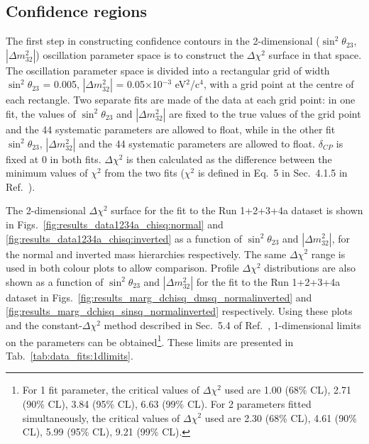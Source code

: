 \clearpage

\subsection {Confidence regions}
\label{sec:results_contours}

The first step in constructing confidence contours in the 2-dimensional ($\sin^{2}\theta_{23}$, $|\Delta m^{2}_{32}|$)
oscillation parameter space is to construct the $\Delta\chi^2$ surface in that space.
The oscillation parameter space is divided into a rectangular grid of width $\sin^{2}\theta_{23}$ = 0.005, $|\Delta m^{2}_{32}|$ = 
0.05$\times$10$^{-3}$ eV$^{2}$/c$^{4}$, with a grid point at the centre of each rectangle. Two separate fits are made of 
the data at each grid point: in one fit, the values of $\sin^{2}\theta_{23}$ and $|\Delta m^{2}_{32}|$ are fixed to the true 
values of the grid point and the 44 systematic parameters are allowed to float, while in the other fit $\sin^{2}\theta_{23}$, 
$|\Delta m^{2}_{32}|$ and the 44 systematic parameters are allowed to float. $\delta_{CP}$ is fixed at 0 in both fits.
$\Delta\chi^2$ is then calculated as the 
difference between the minimum values of $\chi^{2}$ from the two fits ($\chi^{2}$ is defined in Eq.\ 5 in Sec.\ 4.1.5 
in Ref.\ \cite{OurRun123DisappAnalysis3Flavour}).

The 2-dimensional $\Delta\chi^2$ surface for the fit to the Run 1+2+3+4a dataset is shown in
Figs.\ \ref{fig:results_data1234a_chisq:normal} and \ref{fig:results_data1234a_chisq:inverted}
as a function of $\sin^{2}\theta_{23}$ and $|\Delta m^{2}_{32}|$,
for the normal and inverted mass hierarchies respectively.
The same $\Delta\chi^2$ range is used in both %
colour plots to allow comparison.
Profile $\Delta\chi^2$ distributions are also shown as a function of $\sin^{2}\theta_{23}$ 
and $|\Delta m^{2}_{32}|$ for the %
fit to the Run 1+2+3+4a dataset in 
Figs.\ \ref{fig:results_marg_dchisq_dmsq_normalinverted} and \ref{fig:results_marg_dchisq_sinsq_normalinverted} respectively.
Using these plots and the constant-$\Delta\chi^2$ method described in Sec.\ 5.4 of Ref.\ \cite{OurRun123DisappAnalysis3Flavour},
1-dimensional limits on the parameters can be obtained\footnote{
For 1 fit parameter, the critical values of $\Delta{\chi^{2}}$ used are 
1.00 (68\% CL), 2.71 (90\% CL), 3.84 (95\% CL), 6.63 (99\% CL).
For 2 parameters fitted simultaneously, the critical values of $\Delta{\chi^{2}}$ used are 
2.30 (68\% CL), 4.61 (90\% CL), 5.99 (95\% CL), 9.21 (99\% CL).
}.
These limits are presented in Tab.\ \ref{tab:data_fits:1dlimits}.

